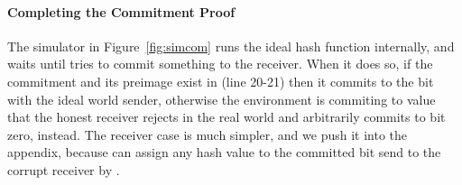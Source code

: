 
\paragraph{Completing the Commitment Proof} 
The simulator in Figure~\ref{fig:simcom} runs the ideal hash function
internally, and waits until \Z tries to commit something to the receiver.  When
it does so, if the commitment and its preimage exist in \Fro (line 20-21) then
it commits to the bit with the ideal world sender, otherwise the environment is
commiting to value that the honest receiver rejects in the real world and
arbitrarily commits to bit zero, instead.  The receiver case is much simpler,
and we push it into the appendix, because \simcom can assign any hash value to
the committed bit send to the corrupt receiver by \Fcom. 

